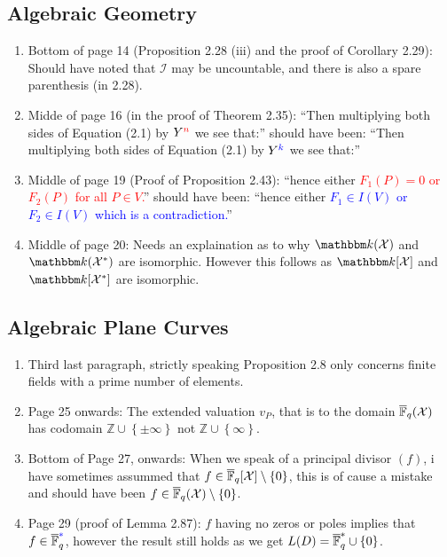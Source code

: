 \documentclass[11pt,a4paper,oneside,openright,english]{article}
\begin{document}
\subsection*{Algebraic Geometry}
\begin{enumerate}
   \item Bottom of page 14 (Proposition 2.28 (iii) and the proof of Corollary 2.29): Should have noted that $\mathcal{I}$ may be uncountable, and there is also a spare parenthesis (in 2.28).
  \item Midde of page 16 (in the proof of Theorem 2.35): ``Then multiplying both sides of Equation (2.1) by $Y^{\color{red}{n}}$ we see that:'' should have been: ``Then multiplying both sides of Equation (2.1) by $Y^{\color{blue}{k}}$ we see that:''
  \item Middle of page 19 (Proof of Proposition 2.43): ``hence either \textcolor{red}{$F_{1}(P) = 0$ or $F_2(P)$ for  all $P \in V$.}'' should have been: ``hence either \textcolor{blue}{$F_1 \in I(V)$ or $F_2 \in I(V)$ which is a contradiction.}''
  \item Middle of page 20: Needs an explaination as to why $\K(\mathcal{X})$ and $\K(\mathcal{X}^{*})$ are isomorphic. However this follows as $\K[\mathcal{X}]$ and $\K[\mathcal{X}^{*}]$ are isomorphic.
\end{enumerate}
\subsection*{Algebraic Plane Curves}
\begin{enumerate}
  \item Third last paragraph, strictly speaking Proposition 2.8 only concerns finite fields with a prime number of elements.
  \item Page 25 onwards: The extended valuation $v_P$, that is to the domain $\overline{\mathbb{F}}_q(\mathcal{X})$ has codomain $\mathbb{Z} \cup \left\{\pm \infty\right\}$ not $\mathbb{Z} \cup \left\{\infty\right\}$.
  \item Bottom of Page 27, onwards: When we speak of a principal divisor $(f)$, i have sometimes assummed that \textcolor{red}{$f \in \overline{\mathbb{F}}_q[\mathcal{X}] \setminus \left\{0\right\}$}, this is of cause a mistake and should have been \textcolor{blue}{$f \in \overline{\mathbb{F}}_q(\mathcal{X}) \setminus \left\{0\right\}$}.
  \item Page 29 (proof of Lemma 2.87): $f$ having no zeros or poles implies that $f \in \overline{\mathbb{F}}_q^{\textcolor{blue}{*}}$, however the result still holds as we get $L(D) = \overline{\mathbb{F}}_q^{*} \cup \left\{0\right\}$.
\end{enumerate}
\end{document}
